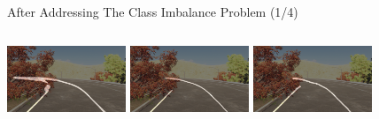 \documentclass[aspectratio=169]{beamer}
\begin{document}
\begin{frame}{After Addressing The Class Imbalance Problem (1/4)}
\begin{columns}[t]
        \includegraphics[width=\columnwidth,height= 2cm]{images/binseg_ce_resa.png}
        \centering
        \includegraphics[width=\columnwidth,height= 2cm]{images/binseg_dice_resa.png}
        \includegraphics[width=\columnwidth,height= 2cm]{images/binseg_focal_resa.png}
        \centering
    \end{columns}

\end{frame}
\end{document}

